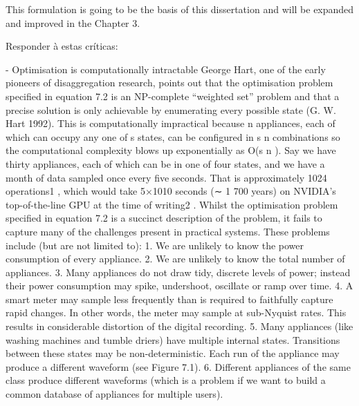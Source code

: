 This formulation is going to be the basis of this dissertation and will be expanded and improved in the Chapter 3. 


\iffalse
Responder à estas críticas:


- Optimisation is computationally intractable
George Hart, one of the early pioneers of disaggregation research, points out that the optimisation
problem specified in equation 7.2 is an NP-complete “weighted set” problem and that
a precise solution is only achievable by enumerating every possible state (G. W. Hart 1992).
This is computationally impractical because n appliances, each of which can occupy any one
of s states, can be configured in s
n
combinations so the computational complexity blows up
exponentially as O(s
n
). Say we have thirty appliances, each of which can be in one of four
states, and we have a month of data sampled once every five seconds. That is approximately
1024 operations1
, which would take 5×1010 seconds (∼ 1 700 years) on NVIDIA’s top-of-the-line
GPU at the time of writing2
.
Whilst the optimisation problem specified in equation 7.2 is a succinct description of the problem,
it fails to capture many of the challenges present in practical systems. These problems
include (but are not limited to):
1. We are unlikely to know the power consumption of every appliance.
2. We are unlikely to know the total number of appliances.
3. Many appliances do not draw tidy, discrete levels of power; instead their power consumption
may spike, undershoot, oscillate or ramp over time.
4. A smart meter may sample less frequently than is required to faithfully capture rapid
changes. In other words, the meter may sample at sub-Nyquist rates. This results in
considerable distortion of the digital recording.
5. Many appliances (like washing machines and tumble driers) have multiple internal states.
Transitions between these states may be non-deterministic. Each run of the appliance
may produce a different waveform (see Figure 7.1).
6. Different appliances of the same class produce different waveforms (which is a problem if
we want to build a common database of appliances for multiple users).
